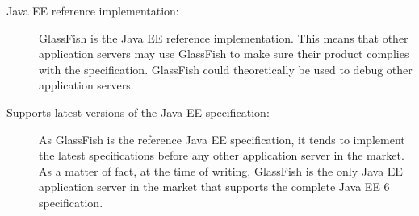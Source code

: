 \begin{description}
\item[Java EE reference implementation:] GlassFish is the Java EE reference implementation. This means that other application servers may use GlassFish to make sure their product complies with the specification. GlassFish could theoretically be used to debug other application servers.

\item[Supports latest versions of the Java EE specification:] As GlassFish is the reference Java EE specification, it tends to implement the latest specifications before any other application server in the market. As a matter of fact, at the time of writing, GlassFish is the only Java EE application server in the market that supports the complete Java EE 6 specification.
\end{description}

